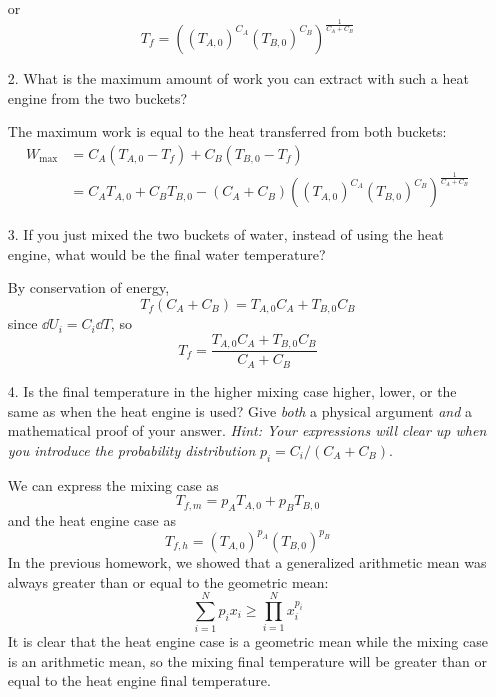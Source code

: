 \documentclass[a4paper,twoside]{article}
\begin{document}
\begin{itemize}
\begin{problem}
            or
            \begin{equation}
                T_f = \left( (T_{A,0})^{C_A} (T_{B,0})^{C_B}\right)^{\frac{1}{C_A + C_B}}
            \end{equation}
        \end{problem}
    \item[2.] What is the maximum amount of work you can extract with such a heat engine from the two buckets?
        \begin{problem}
            The maximum work is equal to the heat transferred from both buckets:
            \begin{align}
                W_{\text{max}} &= C_A(T_{A,0} - T_f) + C_B(T_{B,0} - T_f) \\
                &= C_A T_{A,0} + C_B T_{B,0} - (C_A + C_B)\left( (T_{A,0})^{C_A} (T_{B,0})^{C_B}\right)^{\frac{1}{C_A + C_B}}
            \end{align}
        \end{problem}
    \item[3.] If you just mixed the two buckets of water, instead of using the heat engine, what would be the final water temperature?
        \begin{problem}
            By conservation of energy,
            \begin{equation}
                T_f (C_A + C_B) = T_{A,0} C_A + T_{B,0} C_B
            \end{equation}
            since $ \dd{U_i} = C_i \dd{T} $, so
            \begin{equation}
                T_f = \frac{T_{A,0} C_A + T_{B,0} C_B}{C_A + C_B}
            \end{equation}
        \end{problem}
    \item[4.] Is the final temperature in the higher mixing case higher, lower, or the same as when the heat engine is used? Give \textit{both} a physical argument \textit{and} a mathematical proof of your answer. \textit{Hint: Your expressions will clear up when you introduce the probability distribution} $ p_i = C_i / (C_A + C_B) $.
        \begin{problem}
            We can express the mixing case as
            \begin{equation}
                T_{f,m} = p_A T_{A,0} + p_B T_{B,0}
            \end{equation}
            and the heat engine case as
            \begin{equation}
                T_{f,h} = (T_{A,0})^{p_A} (T_{B,0})^{p_B}
            \end{equation}
            In the previous homework, we showed that a generalized arithmetic mean was always greater than or equal to the geometric mean:
            \begin{equation}
                \sum_{i=1}^{N} p_i x_i \geq \prod_{i=1}^{N} x_i^{p_i}
            \end{equation}
            It is clear that the heat engine case is a geometric mean while the mixing case is an arithmetic mean, so the mixing final temperature will be greater than or equal to the heat engine final temperature.


\end{problem}
\end{itemize}
\end{document}
